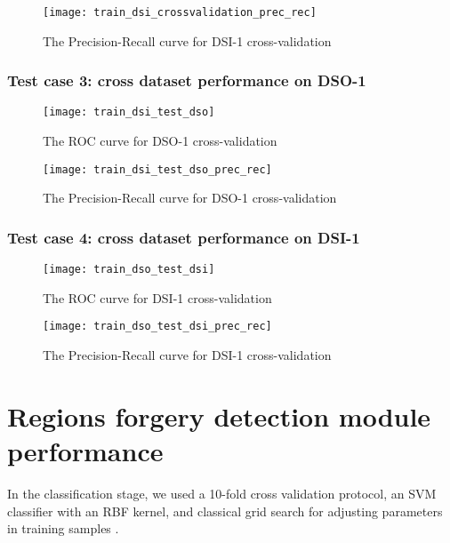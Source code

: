 \begin{figure}[h!]
  \centering
    \texttt{[image: train\_dsi\_crossvalidation\_prec\_rec]}
    \caption{The Precision-Recall curve for DSI-1 cross-validation}
    \label{fig:train_dsi_crossvalidation_prec_rec}
\end{figure}

\subsubsection{Test case 3: cross dataset performance on DSO-1}

\begin{figure}[h!]
  \centering
    \texttt{[image: train\_dsi\_test\_dso]}
    \caption{The ROC curve  for DSO-1 cross-validation}
    \label{fig:train_dsi_test_dso}
\end{figure}

\begin{figure}[h!]
  \centering
    \texttt{[image: train\_dsi\_test\_dso\_prec\_rec]}
    \caption{The Precision-Recall curve for DSO-1 cross-validation}
    \label{fig:train_dsi_test_dso}
\end{figure}

\subsubsection{Test case 4: cross dataset performance on DSI-1}


\begin{figure}[h!]
  \centering
    \texttt{[image: train\_dso\_test\_dsi]}
    \caption{The ROC curve  for DSI-1 cross-validation}
    \label{fig:train_dso_test_dsi}
\end{figure}

\begin{figure}[h!]
  \centering
    \texttt{[image: train\_dso\_test\_dsi\_prec\_rec]}
    \caption{The Precision-Recall curve for DSI-1 cross-validation}
    \label{fig:train_dso_test_dsi_prec_rec}
\end{figure}

\section{Regions forgery detection module performance}


In the classification stage, we used a 10-fold cross validation protocol, an SVM classifier with an RBF
kernel, and classical grid search for adjusting parameters in training samples \cite{bishop2007pattern}.




